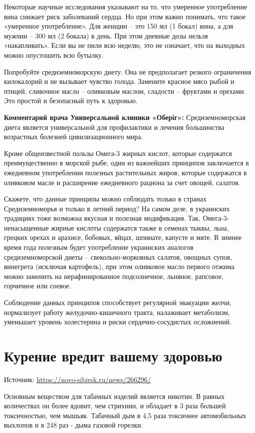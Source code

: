 Некоторые научные исследования указывают на то, что умеренное употребление вина снижает риск заболеваний сердца. Но при этом важно понимать, что такое «умеренное употребление». Для женщин – это 150 мл (1 бокал) вина, а для мужчин – 300 мл (2 бокала) в день. При этом дневные дозы нельзя «накапливать». Если вы не пили всю неделю, это не означает, что на выходных можно опустошить всю бутылку.

Попробуйте средиземноморскую диету. Она не предполагает резкого ограничения килокалорий и не вызывает чувство голода. Замените красное мясо рыбой и птицей, сливочное масло – оливковым маслом, сладости – фруктами и орехами. Это простой и безопасный путь к здоровью.

\textbf{Комментарий врача Универсальной клиники «Оберіг»:} Средиземноморская диета является универсальной для профилактики и лечения большинства возрастных болезней цивилизационного мира.

Кроме общеизвестной пользы Омега-3 жирных кислот, которые содержатся преимущественно в морской рыбе, один из важнейших принципов заключается в ежедневном употреблении полезных растительных жиров, которые содержатся в оливковом масле и расширение ежедневного рациона за счет овощей, салатов.

Скажете, что данные принципы можно соблюдать только в странах Средиземноморья и только в летний период? На самом деле, в украинских традициях тоже возможна вкусная и полезная модификация. Так, Омега-3-ненасыщенные жирные кислоты содержатся также в семенах тыквы, льна, грецких орехах и арахисе, бобовых, яйцах, шпинате, капусте и мяте. В зимнее время года полезным будет употребление украинских аналогов средиземноморской диеты – свекольно-морковных салатов, овощных супов, винегрета (исключая картофель), при этом оливковое масло первого отжима можно заменить на нерафинированное подсолнечное, льняное, рапсовое, горчичное или соевое.


Соблюдение данных принципов способствует регулярной эвакуации желчи, нормализует работу желудочно-кишечного тракта, налаживает метаболизм, уменьшает уровень холестерина и риски сердечно-сосудистых осложнений.




\section{Курение вредит вашему здоровью}
Источник: \url{https://novo-sibirsk.ru/news/266296/}

Основным веществом для табачных изделий является никотин. В равных количествах он более ядовит, чем стрихнин, и обладает в 3 раза большей токсичностью, чем мышьяк. Табачный дым в 4,5 раза токсичнее автомобильных выхлопов и в 248 раз - дыма газовой горелки.

